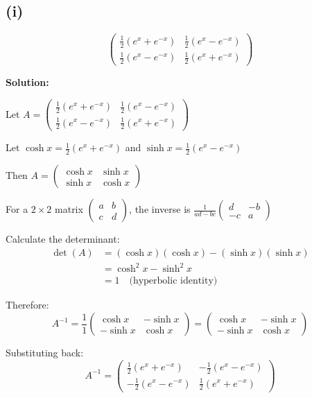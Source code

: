 \subsection*{(i)}
\[
\begin{pmatrix}
\frac{1}{2}(e^x + e^{-x}) & \frac{1}{2}(e^x - e^{-x})\\
\frac{1}{2}(e^x - e^{-x}) & \frac{1}{2}(e^x + e^{-x})
\end{pmatrix}
\]

\textbf{Solution:}

Let $A = \begin{pmatrix}
\frac{1}{2}(e^x + e^{-x}) & \frac{1}{2}(e^x - e^{-x})\\
\frac{1}{2}(e^x - e^{-x}) & \frac{1}{2}(e^x + e^{-x})
\end{pmatrix}$

Let $\cosh x = \frac{1}{2}(e^x + e^{-x})$ and $\sinh x = \frac{1}{2}(e^x - e^{-x})$

Then $A = \begin{pmatrix}
\cosh x & \sinh x\\
\sinh x & \cosh x
\end{pmatrix}$

For a $2 \times 2$ matrix $\begin{pmatrix} a & b \\ c & d \end{pmatrix}$, the inverse is $\frac{1}{ad-bc}\begin{pmatrix} d & -b \\ -c & a \end{pmatrix}$

Calculate the determinant:
\begin{align}
\det(A) &= (\cosh x)(\cosh x) - (\sinh x)(\sinh x)\\
&= \cosh^2 x - \sinh^2 x\\
&= 1 \quad \text{(hyperbolic identity)}
\end{align}

Therefore:
\[
A^{-1} = \frac{1}{1}\begin{pmatrix}
\cosh x & -\sinh x\\
-\sinh x & \cosh x
\end{pmatrix} = \begin{pmatrix}
\cosh x & -\sinh x\\
-\sinh x & \cosh x
\end{pmatrix}
\]

Substituting back:
\[
A^{-1} = \begin{pmatrix}
\frac{1}{2}(e^x + e^{-x}) & -\frac{1}{2}(e^x - e^{-x})\\
-\frac{1}{2}(e^x - e^{-x}) & \frac{1}{2}(e^x + e^{-x})
\end{pmatrix}
\]